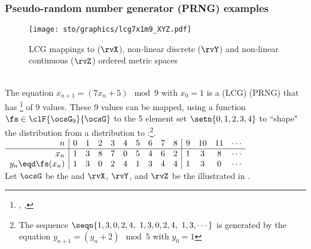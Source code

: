 \begin{tabstr}{0.75}
\subsubsection{Pseudo-random number generator (PRNG) examples}
\begin{figure}[h]
  \gsize%
  \centering%
  \texttt{[image: sto/graphics/lcg7x1m9\_XYZ.pdf]}%
  \caption{LCG mappings to  ($\rvX$), non-linear discrete ($\rvY$)
  and non-linear continuous ($\rvZ$) ordered metric spaces \label{fig:lcg7x1m9_xyz}}
\end{figure}
\begin{example}
\label{ex:lcg7x1m9_xyz}\mbox{}\\
The equation $x_{n+1}=(7x_n+5)\mod9$ with $x_0=1$ is a  (LCG) 
 (PRNG)
that has \footnote{
  ,
  ,
  }
of 9 values.
These 9 values can be mapped, using a   function $\fs\in\clF{\ocsG_9}{\ocsG}$ 
to the 5 element set $\setn{0,1,2,3,4}$ to ``shape" the distribution from a  distribution to 
:\footnote{The sequence $\seqn{1,3,0,2,4,\,\,1,3,0,2,4,\,\,1,3,\cdots}$
is generated by the equation $y_{n+1}=(y_n+2)\mod5$ with $y_0=1$}.
\\\indentx$\begin{array}{r|*{9}{c}|*{4}{c}}
    n             & 0 & 1 & 2 & 3 & 4 & 5 & 6 & 7 & 8    & 9 & 10 & 11 & \cdots\\\hline 
  x_n             & 1 & 3 & 8 & 7 & 0 & 5 & 4 & 6 & 2    & 1 &  3 &  8 & \cdots\\
  y_n\eqd\fs(x_n) & 1 & 3 & 0 & 2 & 4 & 1 & 3 & 4 & 4    & 1 &  3 &  0 & \cdots%
\end{array}$\\
Let $\ocsG$ be the  and 
$\rvX$, $\rvY$, and $\rvZ$ be the  
illustrated in .

\end{example}
\end{tabstr}
